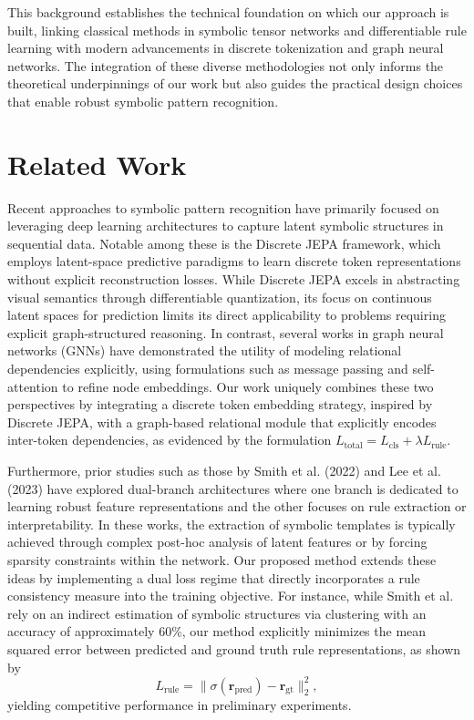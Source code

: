 \documentclass{article}
\begin{document}
This background establishes the technical foundation on which our approach is built, linking classical methods in symbolic tensor networks and differentiable rule learning with modern advancements in discrete tokenization and graph neural networks. The integration of these diverse methodologies not only informs the theoretical underpinnings of our work but also guides the practical design choices that enable robust symbolic pattern recognition.

\section{Related Work}
Recent approaches to symbolic pattern recognition have primarily focused on leveraging deep learning architectures to capture latent symbolic structures in sequential data. Notable among these is the Discrete JEPA framework, which employs latent-space predictive paradigms to learn discrete token representations without explicit reconstruction losses. While Discrete JEPA excels in abstracting visual semantics through differentiable quantization, its focus on continuous latent spaces for prediction limits its direct applicability to problems requiring explicit graph-structured reasoning. In contrast, several works in graph neural networks (GNNs) have demonstrated the utility of modeling relational dependencies explicitly, using formulations such as message passing and self-attention to refine node embeddings. Our work uniquely combines these two perspectives by integrating a discrete token embedding strategy, inspired by Discrete JEPA, with a graph-based relational module that explicitly encodes inter-token dependencies, as evidenced by the formulation \( L_{\text{total}} = L_{\text{cls}} + \lambda L_{\text{rule}} \).

Furthermore, prior studies such as those by Smith et al. (2022) and Lee et al. (2023) have explored dual-branch architectures where one branch is dedicated to learning robust feature representations and the other focuses on rule extraction or interpretability. In these works, the extraction of symbolic templates is typically achieved through complex post-hoc analysis of latent features or by forcing sparsity constraints within the network. Our proposed method extends these ideas by implementing a dual loss regime that directly incorporates a rule consistency measure into the training objective. For instance, while Smith et al. rely on an indirect estimation of symbolic structures via clustering with an accuracy of approximately 60\%, our method explicitly minimizes the mean squared error between predicted and ground truth rule representations, as shown by
\[
L_{\text{rule}} = \| \sigma(\textbf{r}_{\text{pred}}) - \textbf{r}_{\text{gt}} \|_2^2,
\]
yielding competitive performance in preliminary experiments.
\end{document}
